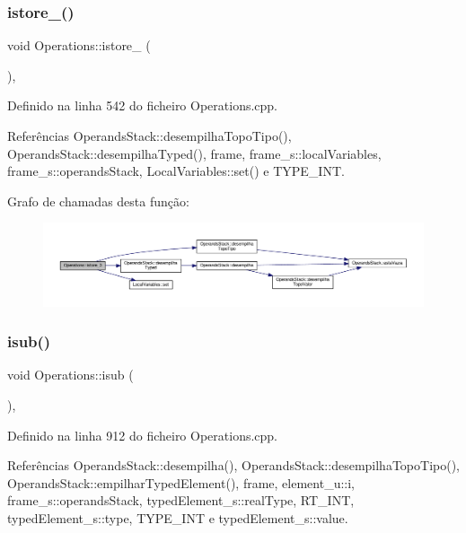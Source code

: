 \subsubsection{\texorpdfstring{istore\+\_()}{istore\_3()}}
{\footnotesize\ttfamily void Operations\+::istore\+\_ (\begin{DoxyParamCaption}{ }\end{DoxyParamCaption})\hspace{0.3cm}{\ttfamily [static]}, {\ttfamily [private]}}



Definido na linha 542 do ficheiro Operations.\+cpp.



Referências Operands\+Stack\+::desempilha\+Topo\+Tipo(), Operands\+Stack\+::desempilha\+Typed(), frame, frame\+\_\+s\+::local\+Variables, frame\+\_\+s\+::operands\+Stack, Local\+Variables\+::set() e T\+Y\+P\+E\+\_\+\+I\+NT.

Grafo de chamadas desta função\+:
\nopagebreak
\begin{figure}[H]
\begin{center}
\leavevmode
\includegraphics[width=350pt]{classOperations_a3ff20f0475eaaa28501ea330074f5cb7_cgraph}
\end{center}
\end{figure}
\mbox{\label{classOperations_ab2808e99336de64fefb2a9073bc251de}} 
\subsubsection{\texorpdfstring{isub()}{isub()}}
{\footnotesize\ttfamily void Operations\+::isub (\begin{DoxyParamCaption}{ }\end{DoxyParamCaption})\hspace{0.3cm}{\ttfamily [static]}, {\ttfamily [private]}}



Definido na linha 912 do ficheiro Operations.\+cpp.



Referências Operands\+Stack\+::desempilha(), Operands\+Stack\+::desempilha\+Topo\+Tipo(), Operands\+Stack\+::empilhar\+Typed\+Element(), frame, element\+\_\+u\+::i, frame\+\_\+s\+::operands\+Stack, typed\+Element\+\_\+s\+::real\+Type, R\+T\+\_\+\+I\+NT, typed\+Element\+\_\+s\+::type, T\+Y\+P\+E\+\_\+\+I\+NT e typed\+Element\+\_\+s\+::value.

